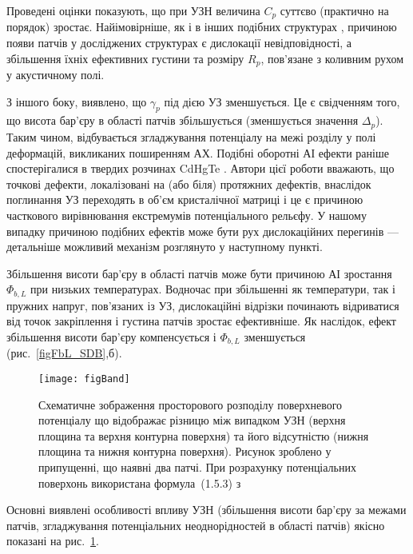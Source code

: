 Проведені оцінки показують,
що при УЗН величина $C_p$ суттєво (практично на порядок) зростає.
Найімовірніше, як і в інших подібних структурах \cite{GELCZUK2014}, причиною появи патчів у досліджених структурах є дислокації невідповідності, а збільшення їхніх ефективних густини та розміру $R_p$,
пов'язане з коливним рухом у акустичному полі.


З іншого боку, виявлено, що $\gamma_p$ під дією УЗ зменшується.
Це є свідченням того, що висота бар'єру в області патчів збільшується (зменшується значення $\Delta_p$).
Таким чином, відбувається згладжування потенціалу на межі розділу у полі деформацій, викликаних поширенням АХ.
Подібні оборотні АІ ефекти раніше спостерігалися в твердих розчинах CdHgTe \cite{Vlasenko2000r}.
Автори цієї роботи вважають, що точкові дефекти, локалізовані на (або біля) протяжних дефектів, внаслідок поглинання УЗ переходять в об'єм кристалічної матриці
і це є причиною часткового вирівнювання екстремумів потенціального рельєфу.
 У нашому  випадку причиною подібних ефектів може бути рух дислокаційних перегинів --- детальніше можливий механізм розглянуто у наступному пункті.

Збільшення висоти бар'єру в області патчів може бути причиною АІ зростання $\Phi_{b,L}$ при низьких температурах.
Водночас при збільшенні як температури, так і пружних напруг, пов'язаних із УЗ,
дислокаційні відрізки починають відриватися від точок закріплення
 і густина патчів зростає ефективніше.
Як наслідок, ефект збільшення висоти бар'єру компенсується і $\Phi_{b,L}$ зменшується (рис.~\ref{figFbL_SDB},б).

\begin{figure}
\center
\texttt{[image: figBand]}
\caption{\label{figBand}
Схематичне зображення
просторового розподілу поверхневого потенціалу
що відображає різницю між випадком УЗН (верхня площина та верхня контурна поверхня) та
його відсутністю (нижня площина та нижня контурна поверхня).
Рисунок зроблено у припущенні, що наявні два патчі.
При розрахунку потенціальних поверхонь використана формула~(1.5.3) з \cite{Tung:MSE}
}%
\end{figure}

Основні виявлені особливості впливу УЗН (збільшення висоти бар'єру за межами патчів, згладжування потенціальних неоднорідностей в області патчів) якісно показані на рис.~\ref{figBand}.





